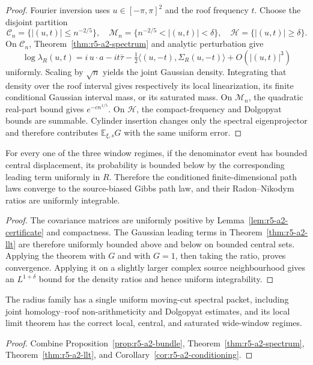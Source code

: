 \begin{proof}
Fourier inversion uses \(u\in[-\pi,\pi]^2\) and the roof frequency \(t\).
Choose the disjoint partition
\[
 {\mathcal C}_n=\{|(u,t)|\le n^{-2/5}\},\quad
 {\mathcal M}_n=\{n^{-2/5}<|(u,t)|<\delta\},\quad
 {\mathcal H}=\{|(u,t)|\ge\delta\}.
\]
On \({\mathcal C}_n\), Theorem~\ref{thm:r5-a2-spectrum} and analytic
perturbation give
\[
 \log\lambda_R(u,t)
 =i\,u\cdot a-it\bar\tau
 -\tfrac12\langle(u,-t),\Sigma_R(u,-t)\rangle
 +O(|(u,t)|^3)
\]
uniformly.  Scaling by \(\sqrt n\) yields the joint Gaussian density.
Integrating that density over the roof interval gives respectively its local
linearization, its finite conditional Gaussian interval mass, or its saturated
mass.  On \({\mathcal M}_n\), the quadratic real-part bound gives
\(e^{-cn^{1/5}}\).  On \({\mathcal H}\), the compact-frequency and Dolgopyat
bounds are summable.  Cylinder insertion changes only the spectral
eigenprojector and therefore contributes \(\mathbb E_{\xi,s}G\) with the same
uniform error.
\end{proof}

\begin{corollary}
\label{cor:r5-a2-conditioning}
For every one of the three window regimes, if the denominator event has
bounded central displacement, its probability is bounded below by the
corresponding leading term uniformly in \(R\).  Therefore the conditioned
finite-dimensional path laws converge to the source-biased Gibbs path law,
and their Radon--Nikodym ratios are uniformly integrable.
\end{corollary}

\begin{proof}
The covariance matrices are uniformly positive by
Lemma~\ref{lem:r5-a2-certificate} and compactness.  The Gaussian leading
terms in Theorem~\ref{thm:r5-a2-llt} are therefore uniformly bounded above
and below on bounded central sets.  Applying the theorem with \(G\) and with
\(G=1\), then taking the ratio, proves convergence.  Applying it on a slightly
larger complex source neighbourhood gives an \(L^{1+\delta}\) bound for the
density ratios and hence uniform integrability.
\end{proof}

\begin{theorem}
\label{thm:r5-a2-main}
The radius family has a single uniform moving-cut spectral packet, including
joint homology--roof non-arithmeticity and Dolgopyat estimates, and its local
limit theorem has the correct local, central, and saturated wide-window
regimes.
\end{theorem}

\begin{proof}
Combine Proposition~\ref{prop:r5-a2-bundle},
Theorem~\ref{thm:r5-a2-spectrum},
Theorem~\ref{thm:r5-a2-llt}, and
Corollary~\ref{cor:r5-a2-conditioning}.
\end{proof}
